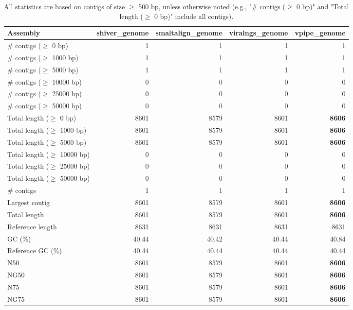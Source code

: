 \documentclass[12pt,a4paper]{article}
\begin{document}
\begin{table}[ht]
\begin{center}
\caption{All statistics are based on contigs of size $\geq$ 500 bp, unless otherwise noted (e.g., "\# contigs ($\geq$ 0 bp)" and "Total length ($\geq$ 0 bp)" include all contigs).}
\begin{tabular}{|l*{4}{|r}|}
\hline
Assembly & shiver\_genome & smaltalign\_genome & viralngs\_genome & vpipe\_genome \\ \hline
\# contigs ($\geq$ 0 bp) & 1 & 1 & 1 & 1 \\ \hline
\# contigs ($\geq$ 1000 bp) & 1 & 1 & 1 & 1 \\ \hline
\# contigs ($\geq$ 5000 bp) & 1 & 1 & 1 & 1 \\ \hline
\# contigs ($\geq$ 10000 bp) & 0 & 0 & 0 & 0 \\ \hline
\# contigs ($\geq$ 25000 bp) & 0 & 0 & 0 & 0 \\ \hline
\# contigs ($\geq$ 50000 bp) & 0 & 0 & 0 & 0 \\ \hline
Total length ($\geq$ 0 bp) & 8601 & 8579 & 8601 & {\bf 8606} \\ \hline
Total length ($\geq$ 1000 bp) & 8601 & 8579 & 8601 & {\bf 8606} \\ \hline
Total length ($\geq$ 5000 bp) & 8601 & 8579 & 8601 & {\bf 8606} \\ \hline
Total length ($\geq$ 10000 bp) & 0 & 0 & 0 & 0 \\ \hline
Total length ($\geq$ 25000 bp) & 0 & 0 & 0 & 0 \\ \hline
Total length ($\geq$ 50000 bp) & 0 & 0 & 0 & 0 \\ \hline
\# contigs & 1 & 1 & 1 & 1 \\ \hline
Largest contig & 8601 & 8579 & 8601 & {\bf 8606} \\ \hline
Total length & 8601 & 8579 & 8601 & {\bf 8606} \\ \hline
Reference length & 8631 & 8631 & 8631 & 8631 \\ \hline
GC (\%) & 40.44 & 40.42 & 40.44 & 40.84 \\ \hline
Reference GC (\%) & 40.44 & 40.44 & 40.44 & 40.44 \\ \hline
N50 & 8601 & 8579 & 8601 & {\bf 8606} \\ \hline
NG50 & 8601 & 8579 & 8601 & {\bf 8606} \\ \hline
N75 & 8601 & 8579 & 8601 & {\bf 8606} \\ \hline
NG75 & 8601 & 8579 & 8601 & {\bf 8606} \\ \hline

\end{tabular}
\end{center}
\end{table}
\end{document}
